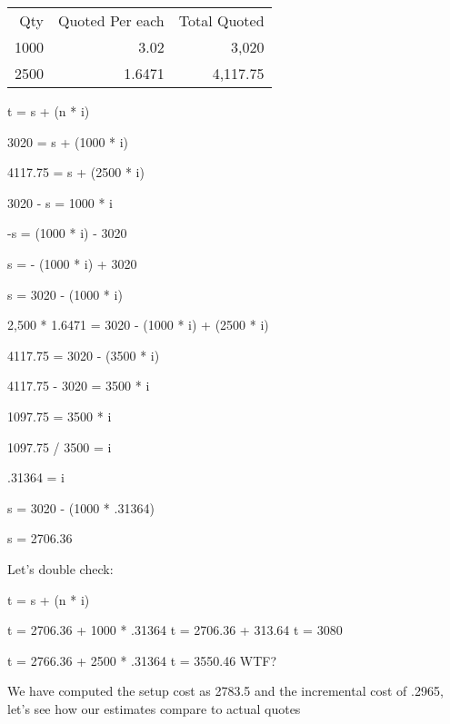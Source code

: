 \documentclass[a4paper,10pt]{article}
\begin{document}
\begin{tabular}{ r | r | r }
Qty  & Quoted Per each  & Total Quoted   \\ 
1000 & 3.02             & 3,020 \\
2500 & 1.6471           & 4,117.75 \\
 
\end{tabular}

t = s + (n * i)

3020 = s + (1000 * i)

4117.75 = s + (2500 * i)

3020 - s = 1000 * i

-s = (1000 * i) - 3020

s = - (1000 * i) + 3020

s = 3020 - (1000 * i)

2,500 * 1.6471 = 3020 - (1000 * i) + (2500 * i)

4117.75 = 3020 - (3500 * i)

4117.75 - 3020 = 3500 * i

1097.75 = 3500 * i

1097.75 / 3500 = i

.31364 = i

s = 3020 - (1000 * .31364)

s = 2706.36

Let's double check:

t = s + (n * i)

t = 2706.36 + 1000 * .31364
t = 2706.36 + 313.64
t = 3080    

t = 2766.36 + 2500 * .31364
t = 3550.46  WTF?


We have computed the setup cost as 2783.5 and the incremental cost of .2965, let's see 
how our estimates compare to actual quotes
\end{document}
